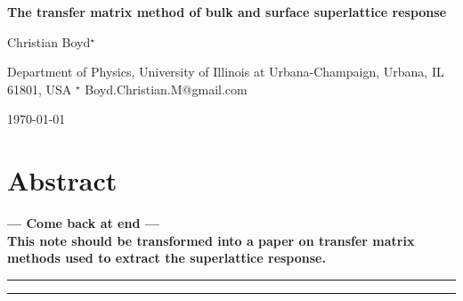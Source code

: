 \documentclass[submission, Phys]{SciPost}
\begin{document}
\begin{center}{\Large \textbf{
The transfer matrix method of bulk and surface superlattice response
}}\end{center}

\begin{center}
Christian Boyd$^\star$
\end{center}

\begin{center}
Department of Physics, University of Illinois at Urbana-Champaign, Urbana, IL 61801, USA
${}^\star$ {\small \sf Boyd.Christian.M@gmail.com}
\end{center}

\begin{center}
\today
\end{center}


\section*{Abstract}
{\bf
--- Come back at end ---\\
This note should be transformed into a paper on transfer matrix methods used to extract the superlattice response.
}


\vspace{10pt}
\noindent\rule{\textwidth}{1pt}
\tableofcontents\thispagestyle{fancy}
\noindent\rule{\textwidth}{1pt}
\vspace{10pt}
\end{document}
